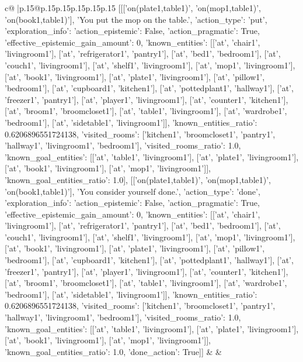 \documentclass{article}
\begin{document}
{\begin{supertabular}{c@{$\;$}|p{.15\linewidth}@{}p{.15\linewidth}p{.15\linewidth}p{.15\linewidth}p{.15\linewidth}p{.15\linewidth}}
{{{	 [[['on(plate1,table1)', 'on(mop1,table1)', 'on(book1,table1)'], 'You put the mop on the table.', {'action_type': 'put', 'exploration_info': {'action_epistemic': False, 'action_pragmatic': True, 'effective_epistemic_gain_amount': 0, 'known_entities': [['at', 'chair1', 'livingroom1'], ['at', 'refrigerator1', 'pantry1'], ['at', 'bed1', 'bedroom1'], ['at', 'couch1', 'livingroom1'], ['at', 'shelf1', 'livingroom1'], ['at', 'mop1', 'livingroom1'], ['at', 'book1', 'livingroom1'], ['at', 'plate1', 'livingroom1'], ['at', 'pillow1', 'bedroom1'], ['at', 'cupboard1', 'kitchen1'], ['at', 'pottedplant1', 'hallway1'], ['at', 'freezer1', 'pantry1'], ['at', 'player1', 'livingroom1'], ['at', 'counter1', 'kitchen1'], ['at', 'broom1', 'broomcloset1'], ['at', 'table1', 'livingroom1'], ['at', 'wardrobe1', 'bedroom1'], ['at', 'sidetable1', 'livingroom1']], 'known_entities_ratio': 0.6206896551724138, 'visited_rooms': ['kitchen1', 'broomcloset1', 'pantry1', 'hallway1', 'livingroom1', 'bedroom1'], 'visited_rooms_ratio': 1.0, 'known_goal_entities': [['at', 'table1', 'livingroom1'], ['at', 'plate1', 'livingroom1'], ['at', 'book1', 'livingroom1'], ['at', 'mop1', 'livingroom1']], 'known_goal_entities_ratio': 1.0}}], [['on(plate1,table1)', 'on(mop1,table1)', 'on(book1,table1)'], 'You consider yourself done.', {'action_type': 'done', 'exploration_info': {'action_epistemic': False, 'action_pragmatic': True, 'effective_epistemic_gain_amount': 0, 'known_entities': [['at', 'chair1', 'livingroom1'], ['at', 'refrigerator1', 'pantry1'], ['at', 'bed1', 'bedroom1'], ['at', 'couch1', 'livingroom1'], ['at', 'shelf1', 'livingroom1'], ['at', 'mop1', 'livingroom1'], ['at', 'book1', 'livingroom1'], ['at', 'plate1', 'livingroom1'], ['at', 'pillow1', 'bedroom1'], ['at', 'cupboard1', 'kitchen1'], ['at', 'pottedplant1', 'hallway1'], ['at', 'freezer1', 'pantry1'], ['at', 'player1', 'livingroom1'], ['at', 'counter1', 'kitchen1'], ['at', 'broom1', 'broomcloset1'], ['at', 'table1', 'livingroom1'], ['at', 'wardrobe1', 'bedroom1'], ['at', 'sidetable1', 'livingroom1']], 'known_entities_ratio': 0.6206896551724138, 'visited_rooms': ['kitchen1', 'broomcloset1', 'pantry1', 'hallway1', 'livingroom1', 'bedroom1'], 'visited_rooms_ratio': 1.0, 'known_goal_entities': [['at', 'table1', 'livingroom1'], ['at', 'plate1', 'livingroom1'], ['at', 'book1', 'livingroom1'], ['at', 'mop1', 'livingroom1']], 'known_goal_entities_ratio': 1.0}, 'done_action': True}]] 
	  } 
	   } 
	   } 
	 & & \\ 
 

    \theutterance {}  


\end{supertabular}}
\end{document}

